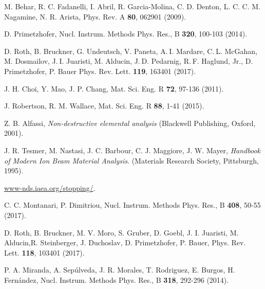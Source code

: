 \begin{thebibliography}{9}
M. Behar, R. C. Fadanelli, I. Abril, R. Garcia-Molina, C. D. Denton, 
L. C. C. M. Nagamine, N. R. Arista, 
Phys. Rev. A \textbf{80},  062901 (2009).

D. Primetzhofer, 
Nucl. Instrum. Methods Phys. Res., B \textbf{320}, 100-103 (2014).

D. Roth, B. Bruckner, G. Undeutsch, V. Paneta, A. I. Mardare, 
C. L. McGahan, M. Dosmailov, J. I. Juaristi, M. Alducin, 
J. D. Pedarnig, R. F. Haglund, Jr., D. Primetzhofer, P. Bauer
Phys. Rev. Lett. \textbf{119}, 163401 (2017).

J. H. Choi, Y. Mao, J. P. Chang, 
Mat. Sci. Eng. R \textbf{72}, 97-136 (2011).

J. Robertson, R. M. Wallace, 
Mat. Sci. Eng. R \textbf{88}, 1-41 (2015).

Z. B. Alfassi,
\textit{Non-destructive elemental analysis}
(Blackwell Publishing, Oxford, 2001).

J. R. Tesmer, M. Nastasi, J. C. Barbour, C. J. Maggiore, J. W. Mayer,
\textit{Handbook of Modern Ion Beam Material Analysis}.
(Materials Research Society, Pittsburgh, 1995).

\href{https://www-nds.iaea.org/stopping/}{www-nds.iaea.org/stopping/}.

C. C. Montanari, P. Dimitriou, 
Nucl. Instrum. Methods Phys. Res., B \textbf{408},  50-55 (2017).

D. Roth, B. Bruckner, M. V. Moro, S. Gruber, D. Goebl, J. I. Juaristi, 
M. Alducin,R. Steinberger, J. Duchoslav, D. Primetzhofer, P. Bauer, 
Phys. Rev. Lett. \textbf{118}, 103401 (2017).

\begin{comment}
\bibitem{zenodo} 
C.C. Montanari \textit{et al.} DOI: 10.5281/zenodo.3678785 
\end{comment}
P. A. Miranda, A. Sep\'ulveda, J. R. Morales, T. Rodriguez, E. Burgos, 
H. Fern\'andez,
Nucl. Instrum. Methods Phys. Res., B \textbf{318}, 292-296  (2014).


\end{thebibliography}
